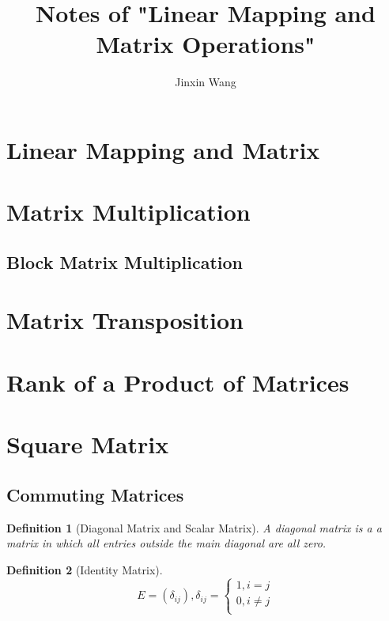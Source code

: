 \documentclass[onecolumn]{ctexart}
\title{Notes of "Linear Mapping and Matrix Operations"}
\author{Jinxin Wang}
\date{}
\newtheorem{definition}{Definition}
\begin{document}
\maketitle

\section{Linear Mapping and Matrix}

\section{Matrix Multiplication}

\subsection{Block Matrix Multiplication}

\section{Matrix Transposition}

\section{Rank of a Product of Matrices}

\section{Square Matrix}

\subsection{Commuting Matrices}

\begin{definition}[Diagonal Matrix and Scalar Matrix]
  A diagonal matrix is a a matrix in which all entries outside the main diagonal 
  are all zero.
\end{definition}

\begin{definition}[Identity Matrix]
  \begin{equation}
    E = (\delta_{ij}), \delta_{ij} = 
    \begin{cases}
      1, i = j \\
      0, i \neq j \\
    \end{cases}
  \end{equation}
\end{definition}
\end{document}
